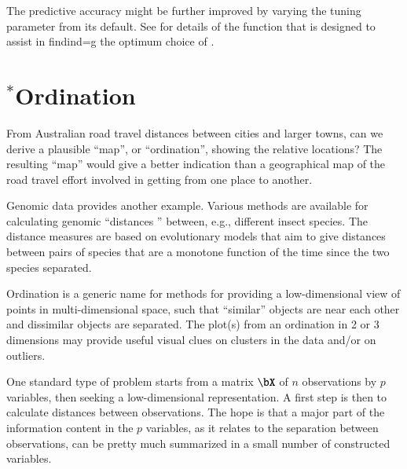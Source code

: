 The predictive accuracy might be further improved by varying the
tuning parameter  from its default.  See 
for details of the function  that is designed to
assist in findind=g the optimum choice of .

\section{$^*$Ordination}

From Australian road travel distances between cities and larger towns,
can we derive a plausible ``map'', or ``ordination'', showing the relative
locations?  The resulting ``map'' would give a better indication
than a geographical map of the road travel effort involved in getting
from one place to another.


Genomic data provides another example. Various methods are available
for calculating genomic ``distances '' between, e.g., different insect
species. The distance measures are based on evolutionary models that
aim to give distances between pairs of species that are a monotone
function of the time since the two species separated.

Ordination is a generic name for methods for providing a low-dimensional
view of points in multi-dimensional space, such that ``similar'' objects
are near each other and dissimilar objects are separated.  The plot(s)
from an ordination in 2 or 3 dimensions may provide useful visual clues
on clusters in the data and/or on outliers.

One standard type of problem starts from a matrix $\bX$ of $n$
observations by $p$ variables, then seeking a low-dimensional
representation.  A first step is then to calculate distances between
observations.
  The hope is that a major part of the information
content in the $p$ variables, as it relates to the separation between
observations, can be pretty much summarized in a small number of
constructed variables.


